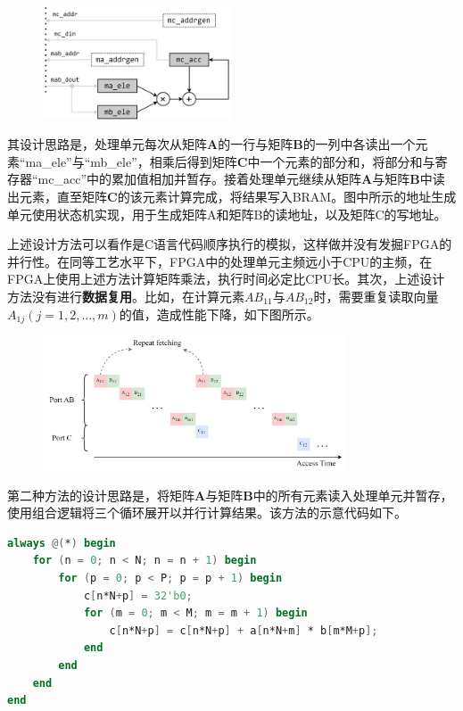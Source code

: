 \documentclass{ctexart}
\begin{document}
\begin{figure}[H]
    \centering
    \includegraphics[width=0.5\textwidth]{lab4/7.png}
\end{figure}

其设计思路是，处理单元每次从矩阵$\boldsymbol{A}$的一行与矩阵$\boldsymbol{B}$的一列中各读出一个元素“ma\_ele”与“mb\_ele”，相乘后得到矩阵$\boldsymbol{C}$中一个元素的部分和，将部分和与寄存器“mc\_acc”中的累加值相加并暂存。接着处理单元继续从矩阵$\boldsymbol{A}$与矩阵$\boldsymbol{B}$中读出元素，直至矩阵$\boldsymbol{C}$的该元素计算完成，将结果写入BRAM。图中所示的地址生成单元使用状态机实现，用于生成矩阵A和矩阵B的读地址，以及矩阵C的写地址。

上述设计方法可以看作是C语言代码顺序执行的模拟，这样做并没有发掘FPGA的并行性。在同等工艺水平下，FPGA中的处理单元主频远小于CPU的主频，在FPGA上使用上述方法计算矩阵乘法，执行时间必定比CPU长。其次，上述设计方法没有进行\textbf{数据复用}。比如，在计算元素$AB_{11}$与$AB_{12}$时，需要重复读取向量$A_{1j}(j=1,2,...,m)$的值，造成性能下降，如下图所示。

\begin{figure}[H]
    \centering
    \includegraphics[width=0.8\textwidth]{lab4/12.png}
\end{figure}

第二种方法的设计思路是，将矩阵$\boldsymbol{A}$与矩阵$\boldsymbol{B}$中的所有元素读入处理单元并暂存，使用组合逻辑将三个循环展开以并行计算结果。该方法的示意代码如下。

\begin{lstlisting}[language=Verilog]
always @(*) begin
    for (n = 0; n < N; n = n + 1) begin
        for (p = 0; p < P; p = p + 1) begin
            c[n*N+p] = 32'b0;
            for (m = 0; m < M; m = m + 1) begin
                c[n*N+p] = c[n*N+p] + a[n*N+m] * b[m*M+p];
            end
        end
    end
end
\end{lstlisting}
\end{document}
